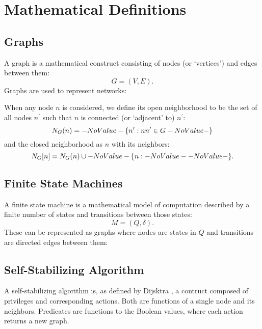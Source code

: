
\section{Mathematical Definitions}
\label{sec:math-defin}

\subsection{Graphs}
\label{sec:graphs}

A \gls{graph} is a mathematical construct
  consisting of \glspl{node} (or `vertices') and \glspl{edge} between them:
  \[ G = (V, E). \]
Graphs are used to represent networks:

When any node $n$ is considered, we define its \gls{open neighborhood} to be
  the set of all nodes $n^\prime$ such that $n$ is connected (or `adjacent' to) $n^\prime$:
  \[ \OpenNeighborhood{n}[G] = \Set{n^\prime}[nn^\prime \in G] \]
  and the \gls{closed neighborhood} as $n$ with its neighbors:
  \[ \ClosedNeighborhood{n}[G] = \OpenNeighborhood{n}[G] \cup \Set{n}. \]

\subsection{Finite State Machines}
\label{sec:fsm}

A \gls{finite state machine} is a mathematical model of computation
  described by a finite number of states and transitions between those states:
  \[ M = (Q, \delta). \]
These can be represented as graphs where nodes are states in $Q$ and
  transitions are directed edges between them:

\subsection{Self-Stabilizing Algorithm}
\label{sec:self-stab-algor}

A self-stabilizing algorithm is, as defined by
  Dijsktra \autocite{Dijkstra:1974:SSS:361179.361202},
  a contruct composed of \glspl{privilege} and corresponding \glspl{action}.
Both are functions of a single node and its neighbors.
Predicates are functions to the Boolean values,
  where each action returns a new graph.

